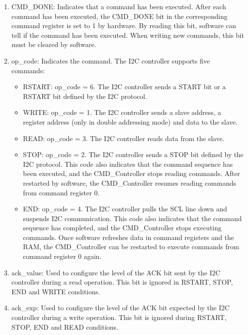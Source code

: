 \documentclass[main\_\_EN.tex]{subfiles}
\begin{document}
\begin{enumerate}

\item CMD\_DONE: Indicates that a command has been executed. After each command has been executed, the CMD\_DONE bit in the corresponding command register is set to 1 by hardware. By reading this bit, software can tell if the command has been executed. When writing new commands, this bit must be cleared by software.

\item op\_code: Indicates the command. The I2C controller supports five commands:

\begin{itemize}
    \item RSTART: op\_code = 6. The I2C controller sends a START bit or a RSTART bit defined by the I2C protocol.

    \item WRITE: op\_code = 1. The I2C controller sends a slave address, a register address  (only in double addressing mode) and data to the slave.

    \item READ: op\_code = 3. The I2C controller reads data from the slave.

    \item STOP: op\_code = 2. The I2C controller sends a STOP bit defined by the I2C protocol. This code also indicates that the command sequence has been executed, and the CMD\_Controller stops reading commands. After restarted by software, the CMD\_Controller resumes reading commands from command register 0.

    \item END: op\_code = 4. The I2C controller pulls the SCL line down and suspends I2C communication. This code also indicates that the command sequence has completed, and the CMD\_Controller stops executing commands. Once software refreshes data in command registers and the RAM, the CMD\_Controller can be restarted to execute commands from command register 0 again.
\end{itemize}

\item ack\_value: Used to configure the level of the ACK bit sent by the I2C controller during a read operation. This bit is ignored in RSTART, STOP, END and WRITE conditions.

\item ack\_exp: Used to configure the level of the ACK bit expected by the I2C controller during a write operation. This bit is ignored during RSTART, STOP, END and READ conditions.


\end{enumerate}
\end{document}
